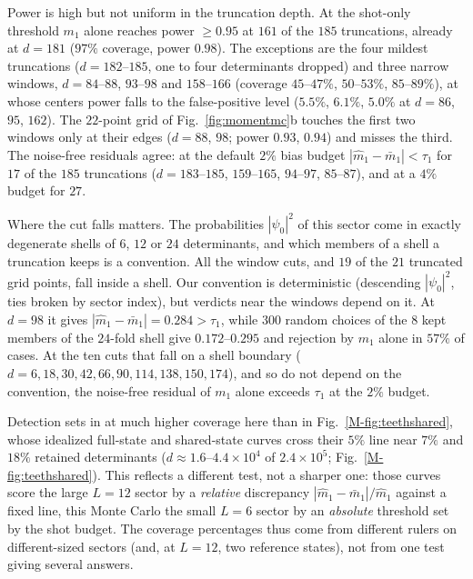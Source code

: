 \documentclass[aps,prb,onecolumn,superscriptaddress,longbibliography,floatfix]{revtex4-2}
\begin{document}
Power is high but not uniform in the truncation depth. At the shot-only threshold $m_1$ alone reaches power $\ge0.95$ at $161$ of the $185$ truncations, already at $d=181$ ($97\%$ coverage, power $0.98$). The exceptions are the four mildest truncations ($d=182$--$185$, one to four determinants dropped) and three narrow windows, $d=84$--$88$, $93$--$98$ and $158$--$166$ (coverage $45$--$47\%$, $50$--$53\%$, $85$--$89\%$), at whose centers power falls to the false-positive level ($5.5\%$, $6.1\%$, $5.0\%$ at $d=86$, $95$, $162$). The $22$-point grid of Fig.~\ref{fig:momentmc}b touches the first two windows only at their edges ($d=88$, $98$; power $0.93$, $0.94$) and misses the third. The noise-free residuals agree: at the default $2\%$ bias budget $|\widehat m_1-\bar m_1|<\tau_1$ for $17$ of the $185$ truncations ($d=183$--$185$, $159$--$165$, $94$--$97$, $85$--$87$), and at a $4\%$ budget for $27$.

Where the cut falls matters. The probabilities $|\psi_0|^2$ of this sector come in exactly degenerate shells of $6$, $12$ or $24$ determinants, and which members of a shell a truncation keeps is a convention. All the window cuts, and $19$ of the $21$ truncated grid points, fall inside a shell. Our convention is deterministic (descending $|\psi_0|^2$, ties broken by sector index), but verdicts near the windows depend on it. At $d=98$ it gives $|\widehat m_1-\bar m_1|=0.284>\tau_1$, while $300$ random choices of the $8$ kept members of the $24$-fold shell give $0.172$--$0.295$ and rejection by $m_1$ alone in $57\%$ of cases. At the ten cuts that fall on a shell boundary ($d=6,18,30,42,66,90,114,138,150,174$), and so do not depend on the convention, the noise-free residual of $m_1$ alone exceeds $\tau_1$ at the $2\%$ budget.

Detection sets in at much higher coverage here than in Fig.~\ref{M-fig:teethshared}, whose idealized full-state and shared-state curves cross their $5\%$ line near $7\%$ and $18\%$ retained determinants ($d\approx1.6$--$4.4\times10^4$ of $2.4\times10^5$; Fig.~\ref{M-fig:teethshared}). This reflects a different test, not a sharper one: those curves score the large $L=12$ sector by a \emph{relative} discrepancy $|\widehat m_1-\bar m_1|/\widehat m_1$ against a fixed line, this Monte Carlo the small $L=6$ sector by an \emph{absolute} threshold set by the shot budget. The coverage percentages thus come from different rulers on different-sized sectors (and, at $L=12$, two reference states), not from one test giving several answers.
\end{document}
